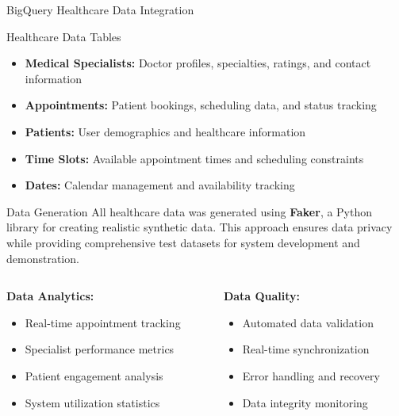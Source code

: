 \documentclass[aspectratio=169]{beamer}
\begin{document}
\begin{frame}{BigQuery Healthcare Data Integration}
\begin{block}{Healthcare Data Tables}
\begin{itemize}
    \item \textbf{Medical Specialists:} Doctor profiles, specialties, ratings, and contact information
    \item \textbf{Appointments:} Patient bookings, scheduling data, and status tracking
    \item \textbf{Patients:} User demographics and healthcare information
    \item \textbf{Time Slots:} Available appointment times and scheduling constraints
    \item \textbf{Dates:} Calendar management and availability tracking
\end{itemize}
\end{block}

\vspace{0.3cm}

\begin{alertblock}{Data Generation}
All healthcare data was generated using \textbf{Faker}, a Python library for creating realistic synthetic data. This approach ensures data privacy while providing comprehensive test datasets for system development and demonstration.
\end{alertblock}

\vspace{0.5cm}

\begin{columns}
\begin{column}{0.5\textwidth}
\textbf{Data Analytics:}
\begin{itemize}
    \item Real-time appointment tracking
    \item Specialist performance metrics
    \item Patient engagement analysis
    \item System utilization statistics
\end{itemize}
\end{column}
\begin{column}{0.5\textwidth}
\textbf{Data Quality:}
\begin{itemize}
    \item Automated data validation
    \item Real-time synchronization
    \item Error handling and recovery
    \item Data integrity monitoring
\end{itemize}
\end{column}
\end{columns}
\end{frame}
\end{document}
